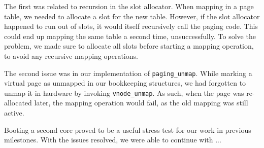 The first was related to recursion in the slot allocator.
When mapping in a page table, we needed to allocate a slot for the new table.
However, if the slot allocator happened to run out of slots, it would itself recursively call the paging code.
This could end up mapping the same table a second time, unsuccessfully.
To solve the problem, we made sure to allocate all slots before starting a mapping operation, to avoid any recursive mapping operations.

The second issue was in our implementation of \verb|paging_unmap|.
While marking a virtual page as unmapped in our bookkeeping structures, we had forgotten to unmap it in hardware by invoking \verb|vnode_unmap|.
As such, when the page was re-allocated later, the mapping operation would fail, as the old mapping was still active.

Booting a second core proved to be a useful stress test for our work in previous milestones.
With the issues resolved, we were able to continue with ...


 
